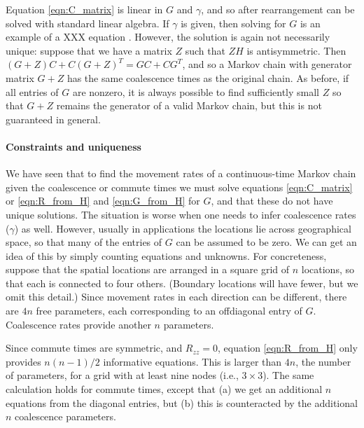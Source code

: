 \documentclass{article}
\begin{document}
Equation \eqref{eqn:C_matrix} is linear in $G$ and $\gamma$,
and so after rearrangement can be solved with standard linear algebra.
If $\gamma$ is given, then solving for $G$ is an example of a XXX equation \citep{matrixeqn}.
However, the solution is again not necessarily unique:
suppose that we have a matrix $Z$ such that $ZH$ is antisymmetric.
Then $(G + Z) C + C (G + Z)^T = GC + CG^T$,
and so a Markov chain with generator matrix $G + Z$ has the same coalescence times
as the original chain.
As before, if all entries of $G$ are nonzero, 
it is always possible to find sufficiently small $Z$
so that $G + Z$ remains the generator of a valid Markov chain,
but this is not guaranteed in general.

\paragraph{Constraints and uniqueness}
We have seen that to find the movement rates of a continuous-time Markov chain
given the coalescence or commute times
we must solve equations \eqref{eqn:C_matrix} or \eqref{eqn:R_from_H} and \eqref{eqn:G_from_H} for $G$,
and that these do not have unique solutions.
The situation is worse when one needs to infer coalescence rates ($\gamma$) as well.
However, usually in applications the locations lie across geographical space,
so that many of the entries of $G$ can be assumed to be zero.
We can get an idea of this by simply counting equations and unknowns.
For concreteness, suppose that the spatial locations
are arranged in a square grid of $n$ locations,
so that each is connected to four others.
(Boundary locations will have fewer, but we omit this detail.)
Since movement rates in each direction can be different,
there are $4n$ free parameters, each corresponding to an offdiagonal entry of $G$.
Coalescence rates provide another $n$ parameters.

Since commute times are symmetric, and $R_{zz} = 0$, 
equation \eqref{eqn:R_from_H} only provides $n (n-1)/2$ informative equations.
This is larger than $4n$, the number of parameters,
for a grid with at least nine nodes (i.e., $3 \times 3$).
The same calculation holds for commute times, 
except that (a) we get an additional $n$ equations from the diagonal entries,
but (b) this is counteracted by the additional $n$ coalescence parameters.
\end{document}
